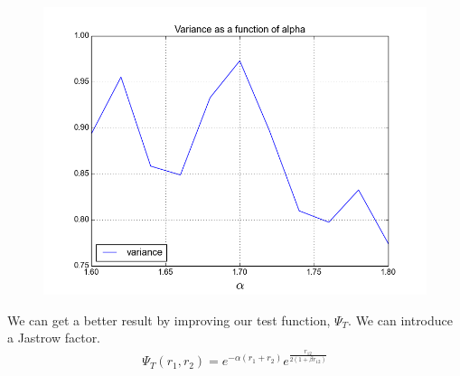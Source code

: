 \documentclass[a4paper, 12pt, titlepage]{article}
\begin{document}
 \begin{figure}[H]
 	\centering
 	\includegraphics[width=\textwidth]{../python_programs/EnergyVariance_helium3.png}
 \end{figure}

 We can get a better result by improving our test function, $\Psi_T$. We can introduce a Jastrow factor. 
 \begin{align*}
 	\Psi_T(r_1,r_2) = e^{-\alpha(r_1 + r_2)}e^{\frac{r_{12}}{2(1+\beta r_{12})}}
 \end{align*}
\end{document}
